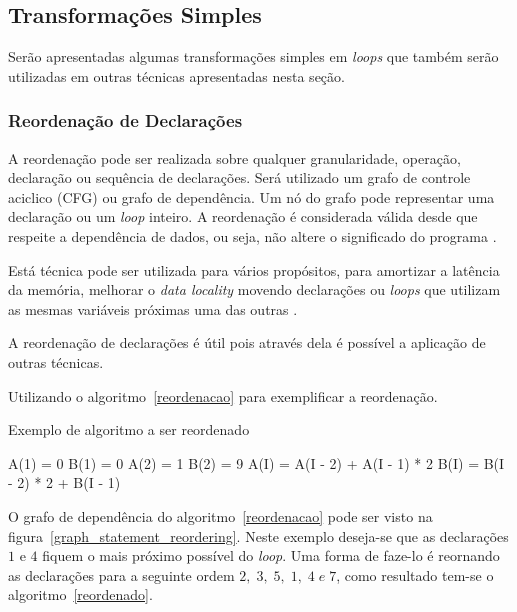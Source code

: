 
\subsection{Transformações Simples}

Serão apresentadas algumas transformações simples em \textit{loops} que também
serão utilizadas em outras técnicas apresentadas nesta seção.

\subsubsection{Reordenação de Declarações}

A reordenação pode ser realizada sobre qualquer granularidade, operação,
declaração ou sequência de declarações. 
Será utilizado um grafo de controle aciclico (CFG) ou grafo de dependência.
Um nó do grafo pode representar uma declaração ou um \textit{loop} inteiro.
A reordenação é considerada válida desde que respeite a dependência de dados, 
ou seja, não altere o significado do programa \cite[9.1]{hpcfpc}.

Está técnica pode ser utilizada para vários propósitos, para 
amortizar a latência da memória, melhorar o \textit{data locality} movendo 
declarações ou \textit{loops} que utilizam as mesmas variáveis próximas uma das 
outras \cite{McKinley:1996}. 

A reordenação de declarações é útil pois através dela é possível 
a aplicação de outras técnicas. 

Utilizando o algoritmo~\ref{reordenacao} para exemplificar a reordenação. 

\begin{algorithm}
\caption{Exemplo de algoritmo a ser reordenado}
\label{reordenacao}
\begin{algorithmic}[1]

\STATE A(1) = 0
\STATE B(1) = 0
\STATE A(2) = 1
\STATE B(2) = 9
\ENDIF
{}
\STATE A(I) = A(I - 2) + A(I - 1) * 2
\STATE B(I) = B(I - 2) * 2 + B(I - 1) 
\ENDFOR

\end{algorithmic}
\end{algorithm}

O grafo de dependência do algoritmo~\ref{reordenacao} pode ser visto na 
figura~\ref{graph_statement_reordering}. 
Neste exemplo deseja-se que as declarações $1$ e $4$ fiquem o mais próximo 
possível do \textit{loop}. 
Uma forma de faze-lo é reornando as declarações para a seguinte ordem $2,\; 3,\; 5,
\;1,\; 4\; e\; 7$, como resultado tem-se o algoritmo~\ref{reordenado}.



